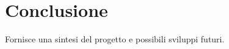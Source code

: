 \chapter{Conclusione} \label{chap:Conclusione}
Fornisce una sintesi del progetto e possibili sviluppi futuri.